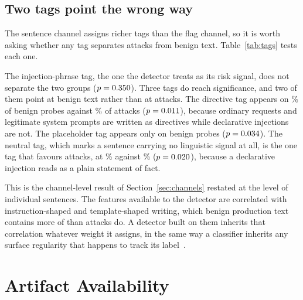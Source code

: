 \documentclass[conference]{IEEEtran}
\begin{document}
\subsection{Two tags point the wrong way}\label{sec:tags}

The sentence channel assigns richer tags than the flag channel, so it is worth
asking whether any tag separates attacks from benign text.
Table~\ref{tab:tags} tests each one.

The injection-phrase tag, the one the detector treats as its risk signal, does
not separate the two groups ($p=0.350{}$). Three tags do reach
significance, and two of them point at benign text rather than at attacks.
The directive tag appears on \TagBenDirective{}\% of benign probes against
\TagAtkDirective{}\% of attacks ($p=0.011{}$), because ordinary
requests and legitimate system prompts are written as directives while
declarative injections are not. The placeholder tag appears only on benign
probes ($p=0.034{}$). The neutral tag, which marks a sentence
carrying no linguistic signal at all, is the one tag that favours attacks,
at \TagAtkNeutral{}\% against \TagBenNeutral{}\% ($p=0.020{}$),
because a declarative injection reads as a plain statement of fact.

\begin{table}[t]
\centering
\caption{Sentence tags as detectors. Direction names the class the tag is more
common in. The tag the detector treats as its risk signal does not separate
the classes, and the two significant tags that do point at benign text.}
\label{tab:tags}
\footnotesize

\end{table}

This is the channel-level result of Section~\ref{sec:channels} restated at the
level of individual sentences. The features available to the detector are
correlated with instruction-shaped and template-shaped writing, which benign
production text contains more of than attacks do. A detector built on them
inherits that correlation whatever weight it assigns, in the same way a
classifier inherits any surface regularity that happens to track its
label~\cite{geirhos2020shortcut, lapuschkin2019cleverhans}.

\section{Artifact Availability}\label{app:artifact}
\end{document}
